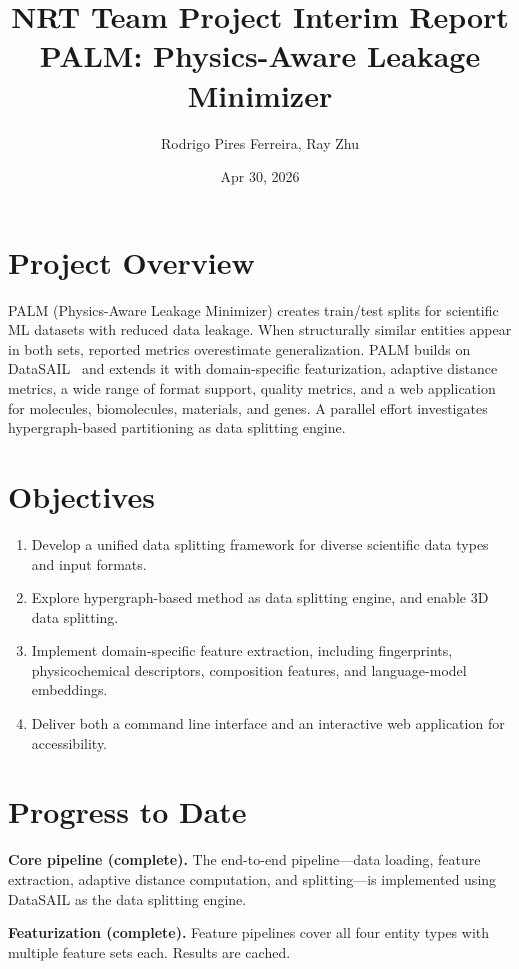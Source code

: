 \documentclass[11pt,oneside]{article}
\title{\vspace{-2em}NRT Team Project Interim Report \\[0.3em] \Large PALM: Physics-Aware Leakage Minimizer\vspace{-0.5em}}
\author{Rodrigo Pires Ferreira, Ray Zhu}
\date{Apr 30, 2026}
\begin{document}
\maketitle
\vspace{-1em}

\section*{Project Overview}

PALM (Physics-Aware Leakage Minimizer) creates train/test splits for scientific ML datasets with reduced data leakage. When structurally similar entities appear in both sets, reported metrics overestimate generalization. PALM builds on DataSAIL~\cite{joeres2025datasail} and extends it with domain-specific featurization, adaptive distance metrics, a wide range of format support, quality metrics, and a web application for molecules, biomolecules, materials, and genes. A parallel effort investigates hypergraph-based partitioning as data splitting engine.


\section*{Objectives}

\begin{enumerate}[nosep,leftmargin=1.5em]
    \item Develop a unified data splitting framework for diverse scientific data types and input formats.
    \item Explore hypergraph-based method as data splitting engine, and enable 3D data splitting.
    \item Implement domain-specific feature extraction, including fingerprints, physicochemical descriptors, composition features, and language-model embeddings.
    \item Deliver both a command line interface and an interactive web application for accessibility.
\end{enumerate}

\section*{Progress to Date}

\textbf{Core pipeline (complete).} The end-to-end pipeline---data loading, feature extraction, adaptive distance computation, and splitting---is implemented using DataSAIL as the data splitting engine.

\textbf{Featurization (complete).} Feature pipelines cover all four entity types with multiple feature sets each. Results are cached.
\end{document}
